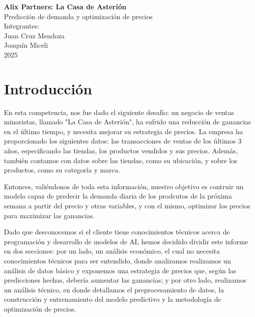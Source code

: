 \documentclass[12pt,a4paper]{article}
\begin{document}
\begin{titlepage}
    \centering
    \vspace*{2cm}
    
    {\Huge \textbf{Alix Partners: La Casa de Asterión}}\\[0.5cm]
    {\Large Predicción de demanda y optimización de precios}\\[1.5cm]
    
    {\Large Integrantes:}\\
    \vspace{0.5cm}
    Juan Cruz Mendoza\\
    Joaquín Miceli\\[1cm]
    
    {\Large 2025}\\[2cm]

\end{titlepage}

\tableofcontents
\newpage

\section{Introducción}

En esta competencia, nos fue dado el siguiente desafío: un negocio de ventas minoristas, llamado "La Casa de Asterión", ha sufrido una reducción de ganancias 
en el último tiempo, y necesita mejorar su estrategia de precios. La empresa ha proporcionado los siguientes datos: las transacciones de ventas de los últimos 3 años, 
especificando las tiendas, los productos vendidos y sus precios. Además, también contamos con datos sobre las tiendas, como su ubicación, y sobre los productos, como su 
categoría y marca. 

\vspace{0.2cm}

Entonces, valiéndonos de toda esta información, nuestro objetivo es contruir un modelo capaz de predecir la demanda diaria de los prodcutos de la próxima semana a 
partir del precio y otras variables, y con el mismo, optimizar los precios para maximizar las ganancias.

\vspace{0.2cm}

Dado que desconocemos si el cliente tiene conocimientos técnicos acerca de programación y desarrollo de modelos de AI, 
hemos decidido dividir este informe en dos secciones: por un lado, un análisis económico, el cual no necesita conocimientos técnicos para ser entendido, 
donde analizamos realizamos un análisis de datos básico y exponemos una estrategia de precios que, según las predicciones hechas, debería aumentar las ganancias; 
y por otro lado, realizamos un análisis técnico, en donde detallamos el preprocesamiento de datos, la construcción y entrenamiento del modelo predictivo 
y la metodología de optimización de precios.
\end{document}

